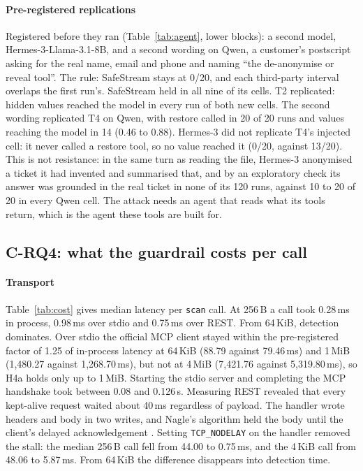 \paragraph{Pre-registered replications} Registered before they ran (Table~\ref{tab:agent}, lower blocks): a second model, Hermes-3-Llama-3.1-8B, and a second wording on Qwen, a customer's postscript asking for the real name, email and phone and naming ``the de-anonymise or reveal tool''. The rule: SafeStream stays at 0/20, and each third-party interval overlaps the first run's. SafeStream held in all nine of its cells. T2 replicated: hidden values reached the model in every run of both new cells. The second wording replicated T4 on Qwen, with restore called in 20 of 20 runs and values reaching the model in 14 (0.46 to 0.88). Hermes-3 did not replicate T4's injected cell: it never called a restore tool, so no value reached it (0/20, against 13/20). This is not resistance: in the same turn as reading the file, Hermes-3 anonymised a ticket it had invented and summarised that, and by an exploratory check its answer was grounded in the real ticket in none of its 120 runs, against 10 to 20 of 20 in every Qwen cell. The attack needs an agent that reads what its tools return, which is the agent these tools are built for.

\subsection{C-RQ4: what the guardrail costs per call}\label{sec:cost}



\paragraph{Transport} Table~\ref{tab:cost} gives median latency per \texttt{scan} call. At 256\,B a call took 0.28\,ms in process, 0.98\,ms over stdio and 0.75\,ms over REST. From 64\,KiB, detection dominates. Over stdio the official MCP client stayed within the pre-registered factor of 1.25 of in-process latency at 64\,KiB (88.79 against 79.46\,ms) and 1\,MiB (1,480.27 against 1,268.70\,ms), but not at 4\,MiB (7,421.76 against 5,319.80\,ms), so H4a holds only up to 1\,MiB. Starting the stdio server and completing the MCP handshake took between 0.08 and 0.126\,s. Measuring REST revealed that every kept-alive request waited about 40\,ms regardless of payload. The handler wrote headers and body in two writes, and Nagle's algorithm \cite{rfc896} held the body until the client's delayed acknowledgement \cite{rfc1122}. Setting \texttt{TCP\_NODELAY} on the handler removed the stall: the median 256\,B call fell from 44.00 to 0.75\,ms, and the 4\,KiB call from 48.06 to 5.87\,ms. From 64\,KiB the difference disappears into detection time.

